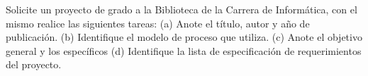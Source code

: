 Solicite un proyecto de grado a la Biblioteca de la Carrera de Informática, con el mismo realice las siguientes
tareas: (a) Anote el título, autor y año de publicación. (b) Identifique el modelo de proceso que utiliza. (c)
Anote el objetivo general y los específicos (d) Identifique la lista de especificación de requerimientos del
proyecto.
